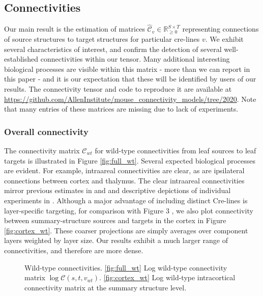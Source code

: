 \newpage

\subsection{Connectivities}

Our main result is the estimation of matrices $\hat {\mathcal C}_v \in \mathbb R_{\geq 0}^{S \times T}$ representing connections of source structures to target structures for particular cre-lines $v$. 
We exhibit several characteristics of interest, and confirm the detection of several well-established connectivities within our tensor.
Many additional interesting biological processes are visible within this matrix - more than we can report in this paper - and it is our expectation that these will be identified by users of our results.
The connectivity tensor and code to reproduce it are available at \url{https://github.com/AllenInstitute/mouse_connectivity_models/tree/2020}.
Note that many entries of these matrices are missing due to lack of experiments.

\subsubsection{Overall connectivity}

The connectivity matrix $\mathcal C_{wt}$ for wild-type connectivities from leaf sources to leaf targets is illustrated in Figure \ref{fig:full_wt}.
Several expected biological processes are evident.
For example, intraareal connectivities are clear, as are ipsilateral connections between cortex and thalymus.
The clear intraareal connectivities mirror previous estimates in \citet{Oh2014-kh} and \citet{Knox2019-ot} and descriptive depictions of individual experiments in \citet{Harris2019-mr}.
Although a major advantage of including distinct Cre-lines is layer-specific targeting, for comparison with Figure 3 \citet{Knox2019-ot}, we also plot connectivity between summary-structure sources and targets in the cortex in Figure \ref{fig:cortex_wt}.
These coarser projections are simply averages over component layers weighted by layer size.
Our results exhibit a much larger range of connectivities, and therefore are more dense.

\newpage

\begin{figure}[H]
\centering
        \newline
   \caption{Wild-type connectivities.
   \ref{fig:full_wt} Log wild-type connectivity matrix $\log \mathcal {C} (s,t,v_{wt})$.
   \ref{fig:cortex_wt} Log wild-type intracortical connectivity matrix at the summary structure level.}
   \label{fig:connectome}
\end{figure}

